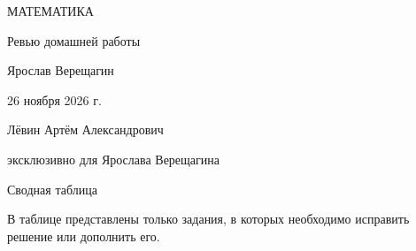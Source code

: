 \documentclass[a4paper,12pt]{article}
\begin{document}
\begin{titlepage}
\centering
\vspace*{25mm}
{\large\color{accent} МАТЕМАТИКА\par}
\vspace{22mm}
{\Huge Ревью домашней работы\par}
\vspace{15mm}
{\Large Ярослав Верещагин\par}
\vspace{9mm}
{\large 26 ноября 2026 г.\par}
\vfill
{\large Лёвин Артём Александрович\par}
{эксклюзивно для Ярослава Верещагина\par}
\vspace{12mm}
\end{titlepage}
\setcounter{page}{1}
{\Large\color{accent} Сводная таблица}\par\vspace{4pt}{\color{accent}\hrule}\medskip
В таблице представлены только задания, в которых необходимо исправить решение или дополнить его.
\end{document}
